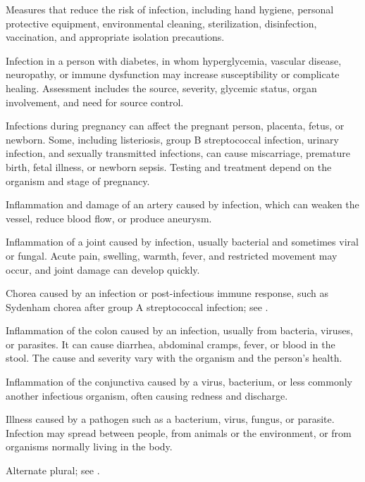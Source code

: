  Measures that reduce the risk of infection, including hand hygiene, personal protective equipment, environmental cleaning, sterilization, disinfection, vaccination, and appropriate isolation precautions.

 Infection in a person with diabetes, in whom hyperglycemia, vascular disease, neuropathy, or immune dysfunction may increase susceptibility or complicate healing. Assessment includes the source, severity, glycemic status, organ involvement, and need for source control.

 Infections during pregnancy can affect the pregnant person, placenta, fetus, or newborn. Some, including listeriosis, group B streptococcal infection, urinary infection, and sexually transmitted infections, can cause miscarriage, premature birth, fetal illness, or newborn sepsis. Testing and treatment depend on the organism and stage of pregnancy.

 Inflammation and damage of an artery caused by infection, which can weaken the vessel, reduce blood flow, or produce aneurysm.

 Inflammation of a joint caused by infection, usually bacterial and sometimes viral or fungal. Acute pain, swelling, warmth, fever, and restricted movement may occur, and joint damage can develop quickly.

 Chorea caused by an infection or post-infectious immune response, such as Sydenham chorea after group A streptococcal infection; see .

 Inflammation of the colon caused by an
  infection, usually from bacteria, viruses, or parasites. It can cause
  diarrhea, abdominal cramps, fever, or blood in the stool. The cause
  and severity vary with the organism and the person's health.

 Inflammation of the conjunctiva caused by a virus, bacterium, or less commonly another infectious organism, often causing redness and discharge.

 Illness caused by a pathogen such as a bacterium, virus, fungus, or parasite. Infection may spread between people, from animals or the environment, or from organisms normally living in the body.

 Alternate plural; see .

